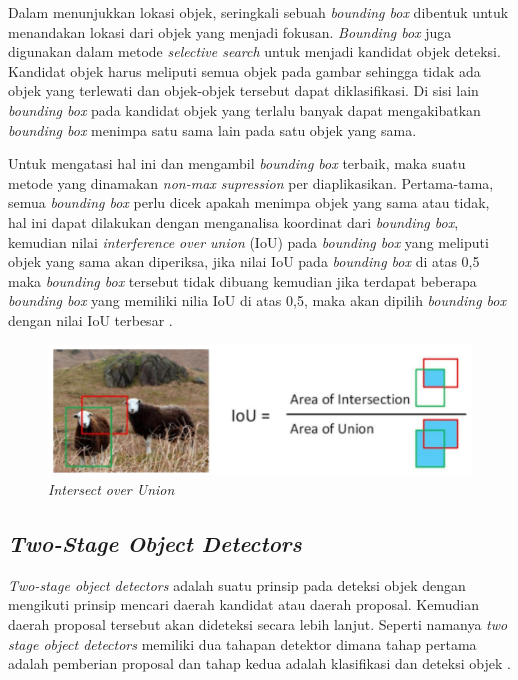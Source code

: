 Dalam menunjukkan lokasi objek, seringkali sebuah \textit{bounding box} dibentuk untuk menandakan lokasi
dari objek yang menjadi fokusan. \textit{Bounding box} juga digunakan dalam metode \textit{selective search}
untuk menjadi kandidat objek deteksi. Kandidat objek harus meliputi semua objek pada gambar sehingga
tidak ada objek yang terlewati dan objek-objek tersebut dapat diklasifikasi. Di sisi lain
\textit{bounding box} pada kandidat objek yang terlalu banyak dapat mengakibatkan \textit{bounding box}
menimpa satu sama lain pada satu objek yang sama. 

Untuk mengatasi hal ini dan mengambil \textit{bounding box}
terbaik, maka suatu metode yang dinamakan \textit{non-max supression} per diaplikasikan. Pertama-tama, 
semua \textit{bounding box} perlu dicek apakah menimpa objek yang sama atau tidak, hal ini dapat dilakukan
dengan menganalisa koordinat dari \textit{bounding box}, kemudian nilai \textit{interference over union} (IoU)
pada \textit{bounding box} yang meliputi objek yang sama akan diperiksa, jika nilai IoU pada
\textit{bounding box} di atas 0,5 maka \textit{bounding box} tersebut tidak dibuang kemudian jika terdapat
beberapa \textit{bounding box} yang memiliki nilia IoU di atas 0,5, maka akan dipilih \textit{bounding box}
dengan nilai IoU terbesar \cite{hawking1988}.

\begin{figure}[h!]
    \begin{center}
      \includegraphics[width= 1\linewidth]{bab2/IoU.png}
      \caption{\textit{Intersect over Union}}
      \label{fig: IoU}
    \end{center}
\end{figure}

\subsection{\textit{Two-Stage Object Detectors}}
\textit{Two-stage object detectors} adalah suatu prinsip pada deteksi objek dengan mengikuti prinsip
mencari daerah kandidat atau daerah proposal. Kemudian daerah proposal tersebut akan dideteksi secara
lebih lanjut. Seperti namanya \textit{two stage object detectors} memiliki dua tahapan detektor
dimana tahap pertama adalah pemberian proposal dan tahap kedua adalah klasifikasi dan deteksi objek
\cite{hawking1988}.


